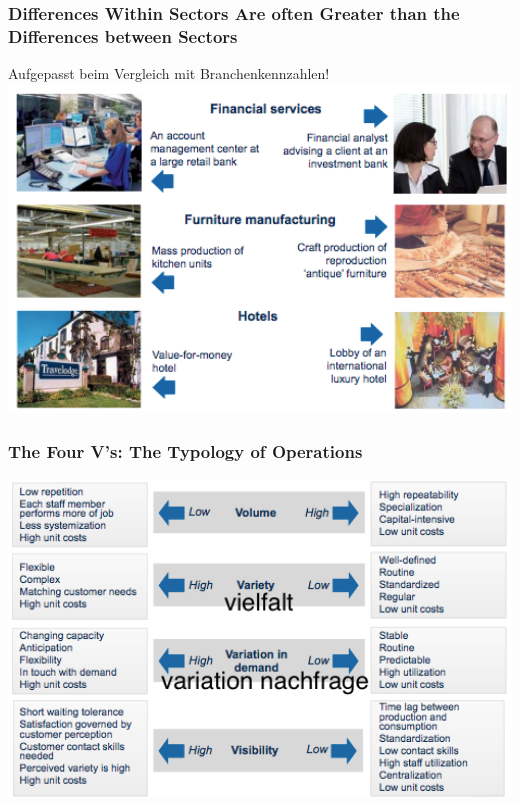 \subsubsection{Differences Within Sectors Are often Greater than the Differences between Sectors}
Aufgepasst beim Vergleich mit Branchenkennzahlen!\\
\includegraphics[width=1\textwidth]{W01/differences_betwee_sectors}
\subsubsection{The Four V’s: The Typology of Operations}
\includegraphics[width=1\textwidth]{W01/four_v}
